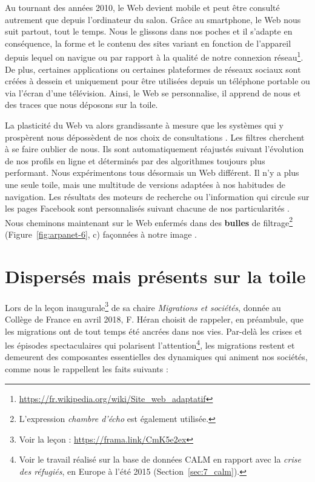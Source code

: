 \documentclass[symmetric,justified,marginals=raggedouter]{tufte-book}
\begin{document}
Au tournant des années 2010, le Web devient mobile et peut être consulté autrement que depuis l'ordinateur du salon. Grâce au smartphone, le Web nous suit partout, tout le temps. Nous le glissons dans nos poches et il s'adapte en conséquence, la forme et le contenu des sites variant en fonction de l'appareil depuis lequel on navigue ou par rapport à la qualité de notre connexion réseau\footnote{\RaggedOuter \url{https://fr.wikipedia.org/wiki/Site\_web\_adaptatif}}. De plus, certaines applications ou certaines plateformes de réseaux sociaux sont créées à dessein et uniquement pour être utilisées depuis un téléphone portable ou via l'écran d'une télévision. Ainsi, le Web se personnalise, il apprend de nous et des traces que nous déposons sur la toile. 

La plasticité du Web va alors grandissante à mesure que les systèmes qui y prospèrent nous dépossèdent de nos choix de consultations \citep{cardon_quoi_2015}. Les filtres cherchent à se faire oublier de nous. Ils sont automatiquement réajustés suivant l'évolution de nos profils en ligne et déterminés par des algorithmes toujours plus performant. Nous expérimentons tous désormais un Web différent. Il n'y a plus une seule toile, mais une multitude de versions adaptées à nos habitudes de navigation. Les résultats des moteurs de recherche ou l'information qui circule sur les pages Facebook sont personnalisés suivant chacune de nos particularités \citep{robertson_auditing_2018}. Nous cheminons maintenant sur le Web enfermés dans des \textbf{bulles} de filtrage\footnote{\RaggedOuter L'expression \textit{chambre d'écho} est également utilisée.} (Figure~\ref{fig:arpanet-6}, c) façonnées à notre image \citep{gillani_me_2018}.

\section{Dispersés mais présents sur la toile}
\label{sec:2_migrant}

\noindent Lors de la leçon inaugurale\footnote{\RaggedOuter Voir la leçon : \url{https://frama.link/CmK5e2ex}} de sa chaire \textit{Migrations et sociétés}, donnée au Collège de France en avril 2018, F. Héran choisit de rappeler, en préambule, que les migrations ont de tout temps été ancrées dans nos vies. Par-delà les crises et les épisodes spectaculaires qui polarisent l'attention\footnote{\RaggedOuter Voir le travail réalisé sur la base de données CALM en rapport avec la \textit{crise des réfugiés}, en Europe à l'été 2015 (Section~\ref{sec:7_calm}).}, les migrations restent et demeurent des composantes essentielles des dynamiques qui animent nos sociétés, comme nous le rappellent les faits suivants : 
\end{document}
